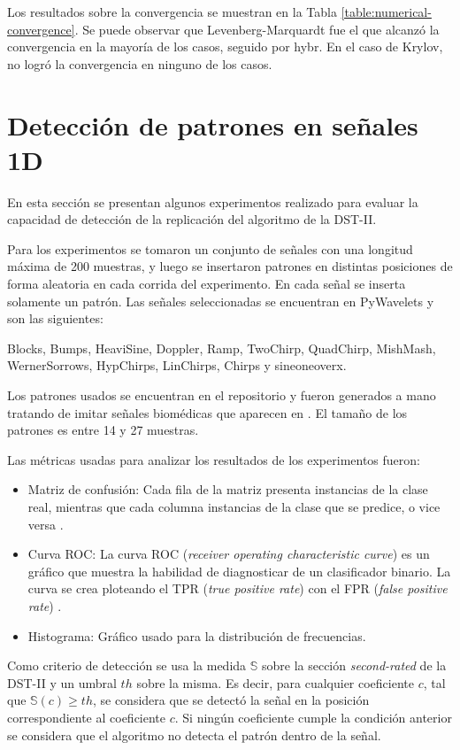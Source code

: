 Los resultados sobre la convergencia se muestran en la Tabla \ref{table:numerical-convergence}. Se puede
observar que Levenberg-Marquardt fue el que alcanzó la convergencia en la mayoría de los casos, seguido 
por hybr. En el caso de Krylov, no logró la convergencia en ninguno de los casos.

\section{Detección de patrones en señales 1D}

En esta sección se presentan algunos experimentos realizado para evaluar la capacidad  de detección de la replicación
del algoritmo de la DST-II.

Para los experimentos se tomaron un conjunto de señales con una longitud máxima de 200 muestras, y luego
se insertaron patrones en distintas posiciones de forma aleatoria en cada corrida del experimento. En cada señal 
se inserta solamente un patrón. Las señales seleccionadas se encuentran en PyWavelets
y son las siguientes:

Blocks, Bumps, HeaviSine, Doppler, Ramp, TwoChirp, QuadChirp, MishMash, WernerSorrows, HypChirps, LinChirps, Chirps y sineoneoverx.

Los patrones usados se encuentran en el repositorio y fueron generados a mano tratando de imitar señales biomédicas que
aparecen en \cite{Guido2018}. El tamaño de los patrones es entre 14 y 27 muestras.

Las métricas usadas para analizar los resultados de los experimentos fueron:

\begin{itemize}
	\item Matriz de confusión: Cada fila de la matriz presenta instancias de la clase real, mientras que cada columna instancias
		de la clase que se predice, o vice versa \cite{CIFUENTES2010}.
	\item Curva ROC: La curva ROC (\textit{receiver operating characteristic curve}) es un gráfico que muestra la habilidad de diagnosticar
		de un clasificador binario. La curva se crea ploteando el TPR (\textit{true positive rate}) con el FPR (\textit{false positive rate})
		\cite{CERDA2012}.
	\item Histograma: Gráfico usado para la distribución de frecuencias. 
\end{itemize}

Como criterio de detección se usa la medida $\mathbb{S}$ sobre la sección \textit{second-rated} de la
DST-II y un umbral $th$ sobre la misma. Es decir, para cualquier coeficiente $c$, tal que $\mathbb{S}(c)\geq th$, se considera
que se detectó la señal en la posición correspondiente al coeficiente $c$. Si ningún coeficiente cumple la condición
anterior se considera que el algoritmo no detecta el patrón dentro de la señal. 

